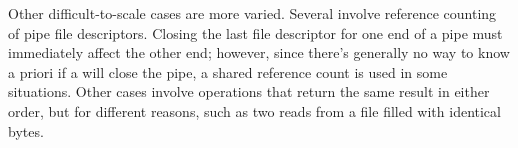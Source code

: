 
Other difficult-to-scale cases are more varied.  Several involve
reference counting of pipe file descriptors.  Closing the last file
descriptor for one end of a pipe must immediately affect the other
end; however, since there's generally no way to know a priori if a
 will close the pipe, a shared reference count is used in
some situations.  Other cases involve operations that return the same
result in either order, but for different reasons, such as two reads
from a file filled with identical bytes.



